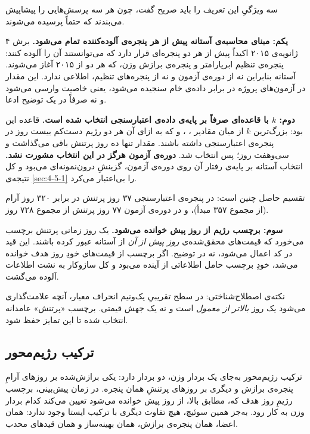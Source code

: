 سه ویژگیِ این تعریف را باید صریح گفت، چون هر سه پرسش‌هایی را پیشاپیش می‌بندند که
حتماً پرسیده می‌شوند.

\textbf{یکم: مبنای محاسبه‌ی آستانه پیش از هر پنجره‌ی آلوده‌کننده تمام می‌شود.} برش ۴
ژانویه‌ی ۲۰۱۵ اکیداً پیش از هر دو پنجره‌ای قرار دارد که می‌توانستند آن را آلوده کنند:
پنجره‌ی تنظیم ابرپارامتر و پنجره‌ی برازش وزن، که هر دو از ۲۰۱۵ آغاز می‌شوند. آستانه
بنابراین نه از دوره‌ی آزمون و نه از پنجره‌های تنظیم، اطلاعی ندارد. این مقدار در
آزمون‌های پروژه در برابر داده‌ی خام سنجیده می‌شود، یعنی خاصیت وارسی می‌شود و نه صرفاً
در یک توضیح ادعا.

\textbf{دوم: $k$ با قاعده‌ای صرفاً بر پایه‌ی داده‌ی اعتبارسنجی انتخاب شده است.} قاعده
این بود: بزرگ‌ترین $k$ از میان مقادیر ، ،  و  که به
ازای آن هر دو رژیم دست‌کم بیست روز در پنجره‌ی اعتبارسنجی داشته باشند. مقدار 
تنها ده روز پرتنش باقی می‌گذاشت و  سی‌وهفت روز؛ پس  انتخاب شد.
\textbf{دوره‌ی آزمون هرگز در این انتخاب مشورت نشد.} انتخاب آستانه بر پایه‌ی رفتار آن
روی دوره‌ی آزمون، گزینشِ درون‌نمونه‌ای می‌بود و کل نتیجه‌ی \cref{sec:4-5-1} را بی‌اعتبار
می‌کرد.

تقسیم حاصل چنین است: در پنجره‌ی اعتبارسنجی ۳۷ روز پرتنش در برابر ۳۲۰ روز آرام (از مجموع ۳۵۷ مبدأ)، و در
دوره‌ی آزمون ۷۷ روز پرتنش از مجموع ۷۲۸ روز.

\textbf{سوم: برچسب رژیم از روز پیش خوانده می‌شود.} یک روز زمانی پرتنش برچسب می‌خورد
که قیمت‌های محقق‌شده‌ی \emph{روز پیش از آن} از آستانه عبور کرده باشند. این قید در کد
اعمال می‌شود، نه در توضیح. اگر برچسب از قیمت‌های خودِ روز هدف خوانده می‌شد، خودِ
برچسب حامل اطلاعاتی از آینده می‌بود و کل سازوکار به نشت اطلاعات آلوده می‌گشت.

نکته‌ی اصطلاح‌شناختی: در سطح تقریبیِ یک‌ونیم انحراف معیار، آنچه علامت‌گذاری می‌شود یک
روز \emph{بالاتر از معمول} است و نه یک جهش قیمتی. برچسب «پرتنش» عامدانه انتخاب شده
تا این تمایز حفظ شود.

\subsection*{ترکیب رژیم‌محور}

ترکیب رژیم‌محور به‌جای یک بردار وزن، دو بردار دارد: یکی برازش‌شده بر روزهای آرامِ
پنجره‌ی برازش و دیگری بر روزهای پرتنشِ همان پنجره. در زمان پیش‌بینی، برچسب رژیمِ روز
هدف  که، مطابق بالا، از روز پیش خوانده می‌شود  تعیین می‌کند کدام بردار
وزن به کار رود. به‌جز همین سوئیچ، هیچ تفاوت دیگری با ترکیب ایستا وجود ندارد: همان
اعضا، همان پنجره‌ی برازش، همان بهینه‌ساز و همان قیدهای محدب.

